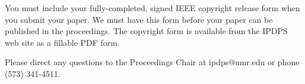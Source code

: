 \documentclass[10pt,twocolumn]{article}
\begin{document}

You must include your fully-completed, signed IEEE copyright release
form when you submit your paper. We must have this form before your
paper can be published in the proceedings. The copyright form is
available from the IPDPS web site as a fillable PDF form.


Please direct any questions to the Proceedings Chair at
ipdps@umr.edu or phone (573) 341-4511.



\end{document}
